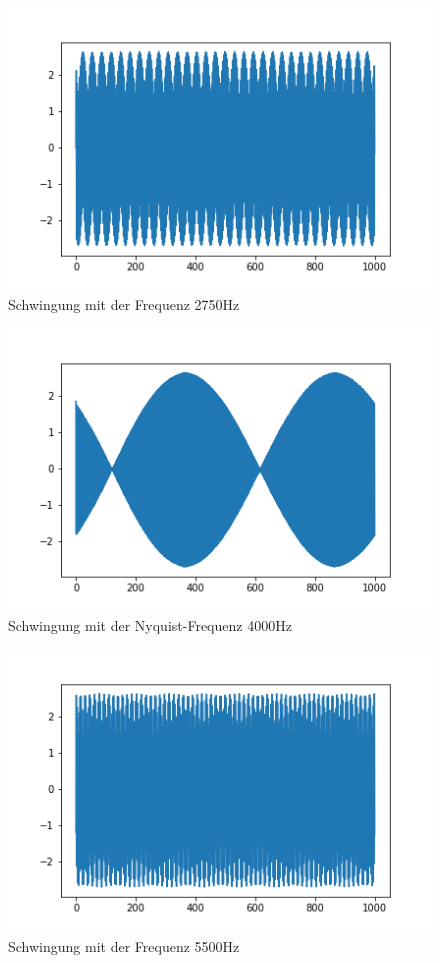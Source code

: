 \documentclass[12pt, oneside, a4paper, \docLanguage]{report}
\begin{document}
\begin{figure}[H]
	\centering\small
	\includegraphics[width=12cm]{2750.png}
	\caption{Schwingung mit der Frequenz 2750Hz}
\end{figure}

\begin{figure}[H]
	\centering\small
	\includegraphics[width=12cm]{4000.png}
	\caption{Schwingung mit der Nyquist-Frequenz 4000Hz}
\end{figure}


\begin{figure}[H]
	\centering\small
	\includegraphics[width=12cm]{5500.png}
	\caption{Schwingung mit der Frequenz 5500Hz}
\end{figure}
\end{document}

